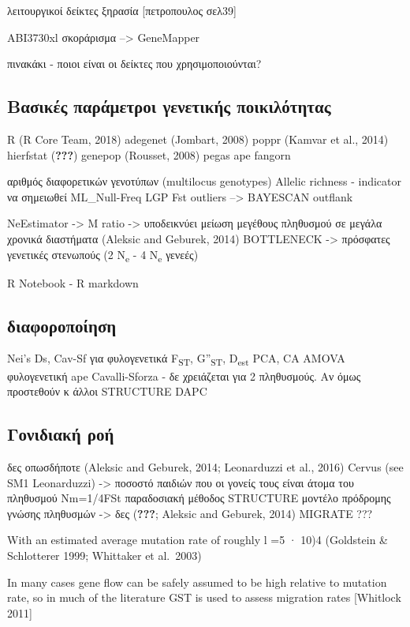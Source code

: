 \documentclass[12pt,a4paper,]{report}
\begin{document}
λειτουργικοί δείκτες ξηρασία {[}πετροπουλος σελ39{]}

ABI3730xl σκοράρισμα --\textgreater{} GeneMapper

πινακάκι - ποιοι είναι οι δείκτες που χρησιμοποιούνται?

\hypertarget{---}{%
\subsection{Βασικές παράμετροι γενετικής ποικιλότητας}\label{---}}

R (R Core Team, 2018) adegenet (Jombart, 2008) poppr (Kamvar et al.,
2014) hierfstat ({\textbf{???}}) genepop (Rousset, 2008) pegas ape
fangorn

αριθμός διαφορετικών γενοτύπων (multilocus genotypes) Allelic richness -
indicator να σημειωθεί ML\_Null-Freq LGP Fst outliers --\textgreater{}
BAYESCAN outflank

NeEstimator -\textgreater{} M ratio -\textgreater{} υποδεικνύει μείωση
μεγέθους πληθυσμού σε μεγάλα χρονικά διαστήματα (Aleksic and Geburek,
2014) BOTTLENECK -\textgreater{} πρόσφατες γενετικές στενωπούς (2
N\textsubscript{e} - 4 N\textsubscript{e} γενεές)

R Notebook - R markdown

\subsection{διαφοροποίηση}

Nei's Ds, Cav-Sf για φυλογενετικά F\textsubscript{ST},
G''\textsubscript{ST}, D\textsubscript{est} PCA, CA AMOVA φυλογενετική
ape Cavalli-Sforza - δε χρειάζεται για 2 πληθυσμούς. Αν όμως προστεθούν
κ άλλοι STRUCTURE DAPC

\hypertarget{-}{%
\subsection{Γονιδιακή ροή}\label{-}}

δες οπωσδήποτε (Aleksic and Geburek, 2014; Leonarduzzi et al., 2016)
Cervus (see SM1 Leonarduzzi) -\textgreater{} ποσοστό παιδιών που οι
γονείς τους είναι άτομα του πληθυσμού Nm=1/4FSt παραδοσιακή μέθοδος
STRUCTURE μοντέλο πρόδρομης γνώσης πληθυσμών -\textgreater{} δες
({\textbf{???}}; Aleksic and Geburek, 2014) MIGRATE ???

With an estimated average mutation rate of roughly l =5 · 10)4
(Goldstein \& Schlotterer 1999; Whittaker et al.~2003)

In many cases gene flow can be safely assumed to be high relative to
mutation rate, so in much of the literature GST is used to assess
migration rates {[}Whitlock 2011{]}
\end{document}
